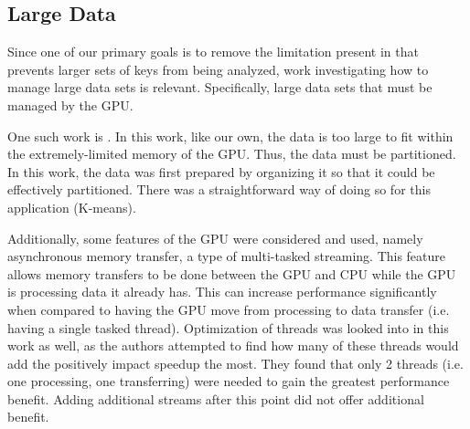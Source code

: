 \documentclass[smallextended]{svjour3}       %
\begin{document}
\subsection{Large Data}
\label{subsec:largedata}
Since one of our primary goals is to remove the limitation present in
\cite{scharfglass2012breaking} that prevents larger sets of keys from being
analyzed, work investigating how to manage large data sets is relevant.
Specifically, large data sets that must be managed by the GPU.

One such work is \cite{wu2009clustering}. In this work, like our own, the data
is too large to fit within the extremely-limited memory of the GPU. Thus, the
data must be partitioned. In this work, the data was first prepared by
organizing it so that it could be effectively partitioned. There was a
straightforward way of doing so for this application (K-means).

Additionally, some features of the GPU were considered and used, namely
asynchronous memory transfer, a type of multi-tasked streaming. This feature
allows memory transfers to be done between the GPU and CPU while the GPU is
processing data it already has. This can increase performance significantly
when compared to having the GPU move from processing to data transfer (i.e.
having a single tasked thread). Optimization of threads was looked into in this
work as well, as the authors attempted to find how many of these threads would
add the positively impact speedup the most. They found that only 2 threads
(i.e. one processing, one transferring) were needed to gain the greatest
performance benefit. Adding additional streams after this point did not offer
additional benefit.

\end{document}
